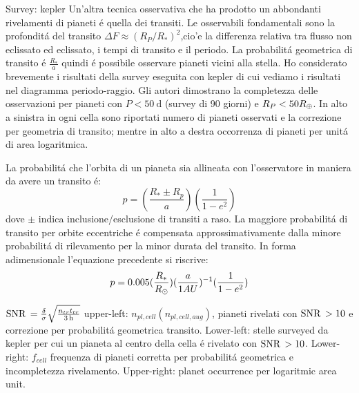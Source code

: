 \begin{wordonframe}{Survey: kepler}
Un'altra tecnica osservativa che ha prodotto un abbondanti rivelamenti di pianeti \'e quella dei transiti. Le osservabili fondamentali sono la profondit\'a del transito $\Delta F\approx (R_P/R_*)^2$,cio'e la differenza relativa tra flusso non eclissato ed eclissato, i tempi di transito e il periodo. La probabilit\'a geometrica di transito \'e $\frac{R_*}{a}$ quindi \'e possibile osservare pianeti vicini alla stella. Ho considerato brevemente i risultati della survey eseguita con kepler di cui vediamo i risultati nel diagramma periodo-raggio.
Gli autori dimostrano la completezza delle osservazioni per pianeti con $P<\SI{50}{\day}$ (survey di 90 giorni) e $R_P<50R_{\oplus}{}$. In alto a sinistra in ogni cella sono riportati numero di pianeti osservati e la correzione per geometria di transito; mentre in alto a destra occorrenza di pianeti per unit\'a di area logaritmica.


La probabilit\'a che l'orbita di un pianeta sia allineata con l'osservatore in maniera da avere un transito \'e:
\begin{equation*}
p=(\frac{R_*\pm R_p}{a})(\frac{1}{1-e^2})
\end{equation*}
dove $\pm$ indica inclusione/esclusione di transiti a raso.
La maggiore probabilit\'a di transito per orbite eccentriche \'e compensata approssimativamente dalla minore probabilit\'a di rilevamento per la minor durata del transito.
In forma adimensionale l'equazione precedente si riscrive:
\begin{equation}
p=0.005(\frac{R_*}{R_{\odot}{}})(\frac{a}{1AU})^{-1}(\frac{1}{1-e^2})
\end{equation}

$\operatorname{SNR}{}=\frac{\delta}{\sigma}\sqrt{\frac{n_{tr}t_{tr}}{\SI{3}{\hour}}}$
upper-left: $n_{pl,cell}(n_{pl,cell,aug})$, pianeti rivelati con $\operatorname{SNR}{}>10$ e correzione per probabilit\'a geometrica transito. Lower-left: stelle surveyed da kepler per cui un pianeta al centro della cella \'e rivelato con $\operatorname{SNR}{}>10$. Lower-right: $f_{cell}$ frequenza di pianeti corretta per probabilit\'a geometrica e incompletezza rivelamento. Upper-right: planet occurrence per logaritmic area unit.
\end{wordonframe}

